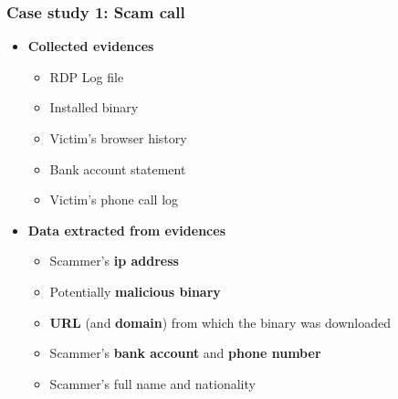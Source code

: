 \begin{frame}
    \frametitle{Case study 1: Scam call}
    \begin{itemize}
        \item[] \textbf{Collected evidences}
        \begin{itemize}
            \item RDP Log file
            \item Installed binary
            \item Victim's browser history
            \item Bank account statement
            \item Victim's phone call log
        \end{itemize}
    \end{itemize}
    \begin{itemize}
        \item[] \textbf{Data extracted from evidences}
        \begin{itemize}
            \item Scammer's \textbf{ip address}
            \item Potentially \textbf{malicious binary}
            \item \textbf{URL} (and \textbf{domain}) from which the binary was downloaded
            \item Scammer's \textbf{bank account} and \textbf{phone number}
            \item Scammer's full name and nationality
        \end{itemize}
    \end{itemize}
\end{frame}

